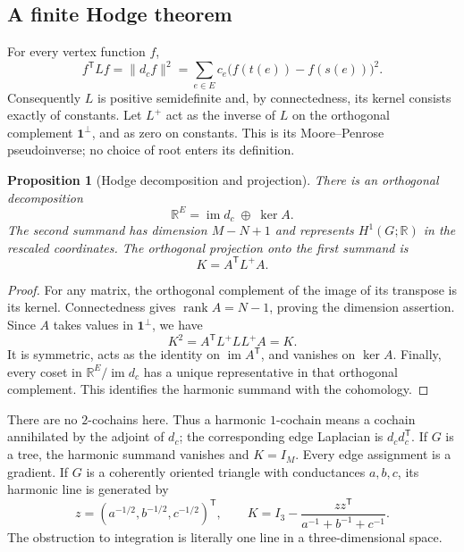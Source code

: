 \documentclass[11pt]{article}
\newtheorem{proposition}[theorem]{Proposition}
\theoremstyle{definition}
\theoremstyle{remark}
\newcommand{\R}{\mathbb R}
\begin{document}
\subsection{A finite Hodge theorem}

For every vertex function $f$,
\begin{equation}\label{eq:glin-energy}
 f^{\mathsf T}Lf=\|d_cf\|^2
 =\sum_{e\in E}c_e\bigl(f(t(e))-f(s(e))\bigr)^2.
\end{equation}
Consequently $L$ is positive semidefinite and, by connectedness, its kernel consists exactly of constants. Let $L^+$ act as the inverse of $L$ on the orthogonal complement $\mathbf1^\perp$, and as zero on constants. This is its Moore--Penrose pseudoinverse; no choice of root enters its definition.

\begin{proposition}[Hodge decomposition and projection]\label{prop:glin-hodge}
There is an orthogonal decomposition
\[
 \R^E=\operatorname{im}d_c\;\mathbin\oplus\;\ker A.
\]
The second summand has dimension $M-N+1$ and represents $H^1(G;\R)$ in the rescaled coordinates. The orthogonal projection onto the first summand is
\begin{equation}\label{eq:glin-projection}
 K=A^{\mathsf T}L^+A.
\end{equation}
\end{proposition}
\begin{proof}
For any matrix, the orthogonal complement of the image of its transpose is its kernel. Connectedness gives $\operatorname{rank}A=N-1$, proving the dimension assertion. Since $A$ takes values in $\mathbf1^\perp$, we have
\[
 K^2=A^{\mathsf T}L^+LL^+A=K.
\]
It is symmetric, acts as the identity on $\operatorname{im}A^{\mathsf T}$, and vanishes on $\ker A$. Finally, every coset in $\R^E/\operatorname{im}d_c$ has a unique representative in that orthogonal complement. This identifies the harmonic summand with the cohomology.
\end{proof}

There are no $2$-cochains here. Thus a harmonic $1$-cochain means a cochain annihilated by the adjoint of $d_c$; the corresponding edge Laplacian is $d_cd_c^{\mathsf T}$. If $G$ is a tree, the harmonic summand vanishes and $K=I_M$. Every edge assignment is a gradient. If $G$ is a coherently oriented triangle with conductances $a,b,c$, its harmonic line is generated by
\[
 z=(a^{-1/2},b^{-1/2},c^{-1/2})^{\mathsf T},\qquad
 K=I_3-\frac{zz^{\mathsf T}}{a^{-1}+b^{-1}+c^{-1}}.
\]
The obstruction to integration is literally one line in a three-dimensional space.
\end{document}
